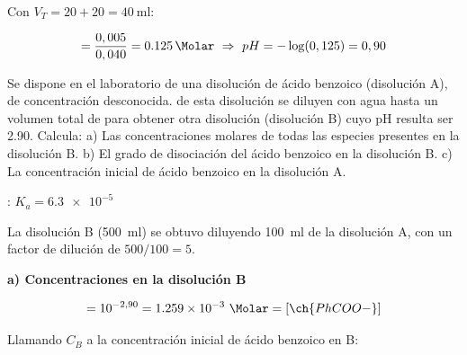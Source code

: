 \begin{exerciseEVAU}
\begin{solu}
        Con \(V_T = 20+20 = \SI{40}{\milli\litre}\):

        \begin{equation*}
            [\ch{H+}] = \dfrac{0,005}{0,040} = \SI{0.125}{\Molar} \ \Rightarrow \ pH = -\log(0,125) = 0,90
        \end{equation*}

    \end{solu}
\end{exerciseEVAU}

\begin{exerciseEVAU}
    Se dispone en el laboratorio de una disolución de ácido benzoico (disolución A), de concentración desconocida.  de esta disolución se diluyen con agua hasta un volumen total de  para obtener otra disolución (disolución B) cuyo pH resulta ser \num{2.90}. Calcula: a) Las concentraciones molares de todas las especies presentes en la disolución B. b) El grado de disociación del ácido benzoico en la disolución B. c) La concentración inicial de ácido benzoico en la disolución A.

    \datos{}: \(K_a = \num{6.3e-5}\)


    \begin{solu}


        La disolución B (\SI{500}{\milli\litre}) se obtuvo diluyendo \SI{100}{\milli\litre} de la disolución A, con un factor de dilución de \(500/100 = 5\).

        \textbf{a) Concentraciones en la disolución B}

        \begin{equation*}
            [\ch{H3O+}] = 10^{-2,90} = \num{1.259e-3} \ \si{\Molar} = [\ch{PhCOO-}]
        \end{equation*}

        Llamando \(C_B\) a la concentración inicial de ácido benzoico en B:


\end{solu}
\end{exerciseEVAU}
